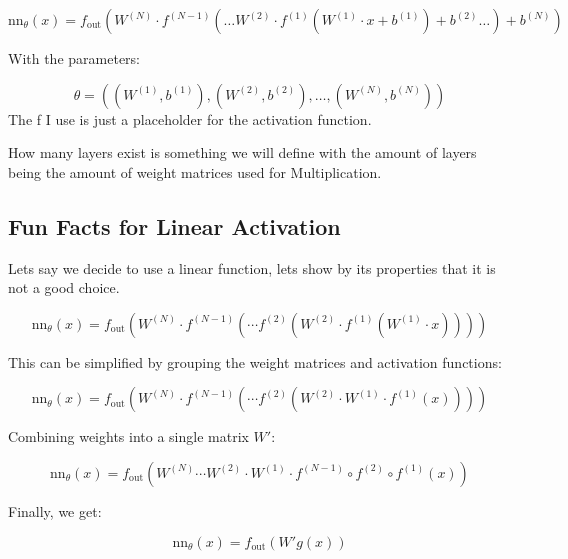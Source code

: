 \documentclass[a4paper]{article}
\begin{document}
    \[
\text{nn}_{\theta}(x) = f_{\text{out}} \left( W^{(N)} \cdot f^{(N-1)} \left( \ldots W^{(2)} \cdot f^{(1)} \left( W^{(1)} \cdot x + b^{(1)} \right) + b^{(2)} \ldots \right) + b^{(N)} \right)
\]

With the parameters:

\[
\theta = \left( (W^{(1)}, b^{(1)}), (W^{(2)}, b^{(2)}), \ldots, (W^{(N)}, b^{(N)}) \right)
\]
The f I use is just a placeholder for the activation function.

How many layers exist is something we will define with the amount of layers being the amount of weight matrices used for Multiplication. 

\subsection{Fun Facts for Linear Activation}
Lets say we decide to use a linear function, lets show by its properties that it is not a good choice. 

\[
\text{nn}_{\theta}(x) = f_{\text{out}}\left(W^{(N)} \cdot f^{(N-1)}\left(\cdots f^{(2)}\left(W^{(2)} \cdot f^{(1)}\left(W^{(1)} \cdot x\right)\right)\right)\right)
\]

This can be simplified by grouping the weight matrices and activation functions:

\[
\text{nn}_{\theta}(x) = f_{\text{out}}\left(W^{(N)} \cdot f^{(N-1)}\left(\cdots f^{(2)}\left(W^{(2)} \cdot W^{(1)} \cdot f^{(1)}(x)\right)\right)\right)
\]

Combining weights into a single matrix \(W'\):

\[
\text{nn}_{\theta}(x) = f_{\text{out}}\left(W^{(N)} \cdots W^{(2)} \cdot W^{(1)} \cdot f^{(N-1)} \circ f^{(2)} \circ f^{(1)}(x)\right)
\]

Finally, we get:

\[
\text{nn}_{\theta}(x) = f_{\text{out}}\left(W' g(x)\right)
\]
\end{document}
